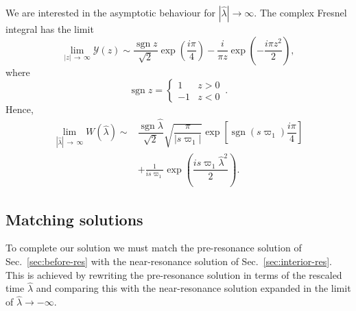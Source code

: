 \documentclass[aps,prd,amsfonts,amssymb,amsmath,nofootinbib,showpacs,superscriptaddress,twocolumn,floatfix]{revtex4-1}
\newcommand{\secref}[1]{Sec.~\ref{sec:#1}}
\newcommand{\recip}[1]{\ensuremath{\frac{1}{#1}}}
\DeclareMathOperator{\sgn}{sgn}
\begin{document}
We are interested in the asymptotic behaviour for $|\widehat{\lambda}| \rightarrow \infty$. The complex Fresnel integral has the limit~\cite{Olver2010} %
\begin{equation}
\lim_{|z|\,\rightarrow\,\infty} \mathcal{Y}(z) \sim \dfrac{\sgn z}{\sqrt{2}} \exp\left(\dfrac{i\pi}{4}\right) - \dfrac{i}{\pi z}\exp\left(-\dfrac{i\pi z^2}{2}\right),
\end{equation}
where 
\begin{equation}
\sgn z = \begin{cases}
1 & z > 0 \\
-1 & z < 0
\end{cases}\,.
\end{equation}
Hence,
\begin{align}
\lim_{|\widehat{\lambda}|\,\rightarrow\,\infty}W\left(\widehat{\lambda}\right) \sim {} & \dfrac{\sgn \widehat{\lambda}}{\sqrt{2}}\sqrt{\dfrac{\pi}{|s\varpi_1|}}\exp\left[\sgn(s\varpi_1)\dfrac{i\pi}{4}\right] \nonumber \\
  {} & + \recip{is\varpi_1}\exp\left(\dfrac{is \varpi_1 \widehat{\lambda}^2}{2}\right).
\label{eq:Fres-limit}
\end{align}

\subsection{Matching solutions}

To complete our solution we must match the pre-resonance solution of \secref{before-res} with the near-resonance solution of \secref{interior-res}. This is achieved by rewriting the pre-resonance solution in terms of the rescaled time $\widehat{\lambda}$ and comparing this with the near-resonance solution expanded in the limit of $\widehat{\lambda} \rightarrow -\infty$.
\end{document}
